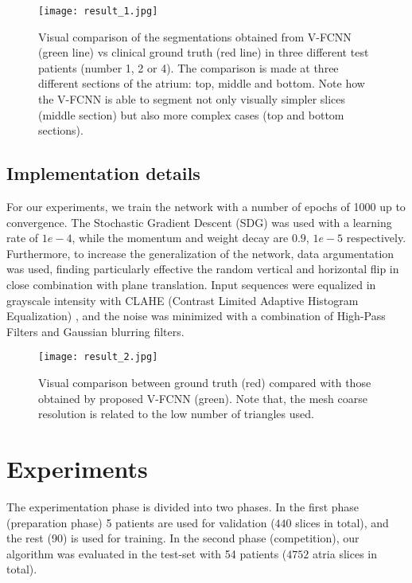 \documentclass{llncs}
\begin{document}
 \begin{figure*}[ht]
\centering
 \texttt{[image: result\_1.jpg]}
   \caption{Visual comparison of the segmentations obtained from V-FCNN (green line) vs clinical ground truth (red line) in three different test patients (number 1, 2 or 4). The comparison is made at three different sections of the atrium: top, middle and bottom. Note how the V-FCNN is able to segment not only visually simpler slices (middle section) but also more complex cases (top and bottom sections).}
\label{fig:fig2}
\end{figure*}


\subsection{Implementation details}

For our experiments, we train the network with a number of epochs of 1000 up to convergence. The Stochastic Gradient Descent (SDG) was used with a  learning rate of $1e-4$, while the momentum and weight decay are $0.9$, $1e-5$ respectively. Furthermore, to increase the generalization of the network, data argumentation was used, finding particularly effective the random vertical and horizontal flip in close combination with plane translation. Input sequences were equalized in grayscale intensity with CLAHE (Contrast Limited Adaptive Histogram Equalization) \cite{Kaur}, and the noise was minimized with a combination of High-Pass Filters and Gaussian blurring filters.

\begin{figure*}[ht]
\centering
 \texttt{[image: result\_2.jpg]}
   \caption{Visual comparison between ground truth  (red) compared with those obtained by proposed V-FCNN (green). Note that, the mesh coarse resolution is related to the low number of triangles used.}
\label{fig:result_2}
\end{figure*}


\section{Experiments}

The experimentation phase is divided into two phases. In the first phase (preparation phase) 5 patients are used for validation ($440$ slices in total), and the rest (90) is used for training. In the second phase (competition), our algorithm was evaluated in the test-set with 54 patients ($4752$ atria slices in total).
\end{document}

